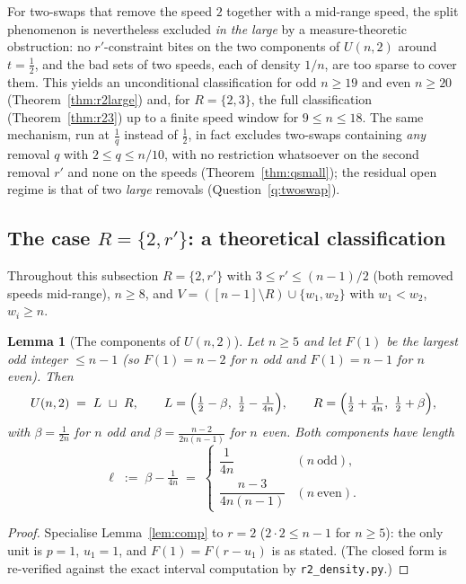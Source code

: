 \documentclass[11pt]{article}
\newtheorem{lemma}[theorem]{Lemma}
\theoremstyle{definition}
\begin{document}
For two-swaps that remove the speed $2$ together with a mid-range speed,
the split phenomenon is nevertheless excluded \emph{in the large} by a
measure-theoretic obstruction: no $r'$-constraint bites on the two
components of $U(n,2)$ around $t=\tfrac12$, and the bad sets of two
speeds, each of density $1/n$, are too sparse to cover them.  This yields
an unconditional classification for odd $n\ge19$ and even $n\ge20$
(Theorem~\ref{thm:r2large}) and, for $R=\{2,3\}$, the full classification
(Theorem~\ref{thm:r23}) up to a finite speed window for $9\le n\le18$.  The same
mechanism, run at $\tfrac1q$ instead of $\tfrac12$, in fact excludes
two-swaps containing \emph{any} removal $q$ with $2\le q\le n/10$, with no
restriction whatsoever on the second removal $r'$ and none on the speeds
(Theorem~\ref{thm:qsmall}); the residual open regime is that of two
\emph{large} removals (Question~\ref{q:twoswap}).

\subsection{The case $R=\{2,r'\}$: a theoretical classification}\label{sec:r2case}

Throughout this subsection $R=\{2,r'\}$ with $3\le r'\le(n-1)/2$ (both
removed speeds mid-range), $n\ge8$, and
$V=([n-1]\setminus R)\cup\{w_1,w_2\}$ with $w_1<w_2$, $w_i\ge n$.

\begin{lemma}[The components of $U(n,2)$]\label{lem:U2}
Let $n\ge5$ and let $F(1)$ be the largest odd integer $\le n-1$
(so $F(1)=n-2$ for $n$ odd and $F(1)=n-1$ for $n$ even).  Then
\[
U(n,2)\;=\;L\ \sqcup\ R,\qquad
L=\Bigl(\tfrac12-\beta,\ \tfrac12-\tfrac1{4n}\Bigr),\qquad
R=\Bigl(\tfrac12+\tfrac1{4n},\ \tfrac12+\beta\Bigr),
\]
with $\beta=\frac1{2n}$ for $n$ odd and $\beta=\frac{n-2}{2n(n-1)}$ for
$n$ even.  Both components have length
\[
\ell\;:=\;\beta-\tfrac1{4n}\;=\;\begin{cases}
\dfrac1{4n} & (n\ \text{odd}),\\[4pt]
\dfrac{n-3}{4n(n-1)} & (n\ \text{even}).
\end{cases}
\]
\end{lemma}

\begin{proof}
Specialise Lemma~\ref{lem:comp} to $r=2$ ($2\cdot2\le n-1$ for $n\ge5$):
the only unit is $p=1$, $u_1=1$, and $F(1)=F(r-u_1)$ is as stated.
(The closed form is re-verified against the exact interval computation
by \texttt{r2\_density.py}.)
\end{proof}
\end{document}
